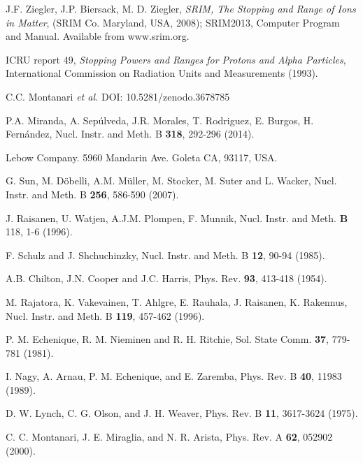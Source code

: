 \documentclass[aps,pra,reprint,superscriptaddress]{revtex4-1}
\begin{document}
\begin{thebibliography}{00}
J.F. Ziegler, J.P. Biersack, M. D. Ziegler, 
\textit{SRIM, The Stopping and Range of Ions in Matter}, 
(SRIM Co. Maryland, USA, 2008); 
SRIM2013, Computer Program and Manual. Available from www.srim.org.

ICRU report 49, \textit{Stopping Powers and Ranges for Protons and Alpha Particles},
International Commission on Radiation Units and Measurements (1993).

C.C. Montanari {\it et al.} DOI: 10.5281/zenodo.3678785 

 P.A. Miranda, A. Sep\'ulveda, J.R. Morales, 
T. Rodriguez, E. Burgos, H. Fern\'andez,
Nucl. Instr. and Meth. B \textbf{318}, 292-296  (2014).

Lebow Company. 5960 Mandarin Ave. Goleta CA, 93117, USA.

G. Sun, M. D\"{o}belli, A.M. M\"{u}ller, M. Stocker, M. Suter and 
L. Wacker, 
Nucl. Instr. and Meth. B \textbf{256}, 586-590 (2007).

J. Raisanen, U. Watjen, A.J.M. Plompen, F. Munnik, 
Nucl. Instr. and Meth. \textbf{B} 118, 1-6  (1996).

F. Schulz and J. Shchuchinzky, 
Nucl. Instr. and Meth. B \textbf{12},  90-94 (1985).

A.B. Chilton, J.N. Cooper and J.C. Harris, 
Phys. Rev. \textbf{93}, 413-418  (1954).

M. Rajatora, K. Vakevainen, T. Ahlgre, E. Rauhala, J. Raisanen, 
K. Rakennus, 
Nucl. Instr. and Meth. B \textbf{119}, 457-462 (1996).

P. M. Echenique, R. M. Nieminen and R. H. Ritchie, 
Sol. State Comm. \textbf{37}, 779-781 (1981).

I. Nagy, A. Arnau, P. M. Echenique, and E. Zaremba, 
Phys. Rev. B \textbf{40}, 11983 (1989).

D. W. Lynch, C. G. Olson, and J. H. Weaver, 
Phys. Rev. B \textbf{11}, 3617-3624 (1975).

C. C. Montanari, J. E. Miraglia, and N. R. Arista, 
Phys. Rev. A \textbf{62}, 052902 (2000).


\end{thebibliography}
\end{document}
